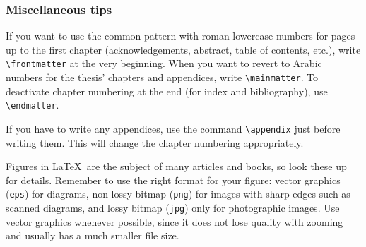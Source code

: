 \documentclass[a4paper,10pt]{article}
\begin{document}
\subsubsection*{Miscellaneous tips}
If you want to use the common pattern with roman lowercase numbers for pages up to the first chapter (acknowledgements, abstract, table of contents, etc.), write \verb|\frontmatter| at the very beginning. When you want to revert to Arabic numbers for the thesis' chapters and appendices, write \verb|\mainmatter|. To deactivate chapter numbering at the end (for index and bibliography), use \verb|\endmatter|.

If you have to write any appendices, use the command \verb|\appendix| just before writing them. This will change the chapter numbering appropriately.

Figures in \LaTeX\ are the subject of many articles and books, so look these up for details. Remember to use the right format for your figure: vector graphics (\texttt{eps}) for diagrams, non-lossy bitmap (\texttt{png}) for images with sharp edges such as scanned diagrams, and lossy bitmap (\texttt{jpg}) only for photographic images. Use vector graphics whenever possible, since it does not lose quality with zooming and usually has a much smaller file size.
\end{document}

